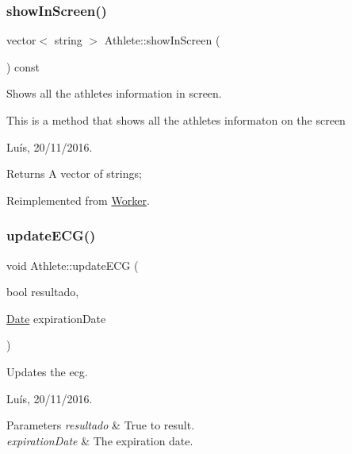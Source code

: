 \subsubsection{\texorpdfstring{show\+In\+Screen()}{showInScreen()}}
{\footnotesize\ttfamily vector$<$ string $>$ Athlete\+::show\+In\+Screen (\begin{DoxyParamCaption}{ }\end{DoxyParamCaption}) const\hspace{0.3cm}{\ttfamily [virtual]}}



Shows all the athlete\textquotesingle{}s information in screen. 

This is a method that shows all the athlete\textquotesingle{}s informaton on the screen

Luís, 20/11/2016. 

\begin{DoxyReturn}{Returns}
A vector of strings; 
\end{DoxyReturn}


Reimplemented from \hyperlink{class_worker_aca1475c72f6e7c6b85114b0bba0da038}{Worker}.

\hypertarget{class_athlete_a7eda9551e23db1e742a33e9ac61bd42d}{}\label{class_athlete_a7eda9551e23db1e742a33e9ac61bd42d} 
\subsubsection{\texorpdfstring{update\+E\+C\+G()}{updateECG()}}
{\footnotesize\ttfamily void Athlete\+::update\+E\+CG (\begin{DoxyParamCaption}\item[{bool}]{resultado,  }\item[{\hyperlink{class_date}{Date}}]{expiration\+Date }\end{DoxyParamCaption})\hspace{0.3cm}{\ttfamily [virtual]}}



Updates the ecg. 

Luís, 20/11/2016. 


\begin{DoxyParams}{Parameters}
{\em resultado} & True to result. \\
\hline
{\em expiration\+Date} & The expiration date. \\
\hline
\end{DoxyParams}


